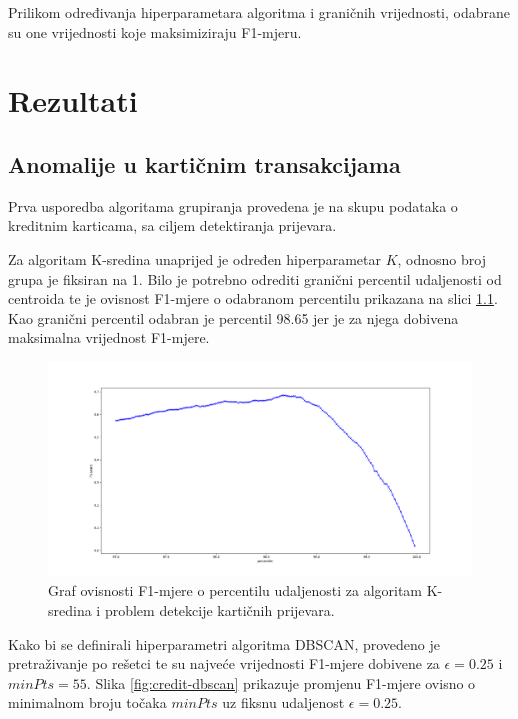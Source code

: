 \documentclass[utf8, diplomski, numeric]{fer}
\begin{document}
Prilikom određivanja hiperparametara algoritma i graničnih vrijednosti, odabrane su one vrijednosti koje maksimiziraju F1-mjeru.


\chapter{Rezultati}

\section{Anomalije u kartičnim transakcijama}
Prva usporedba algoritama grupiranja provedena je na skupu podataka o kreditnim karticama, sa ciljem detektiranja prijevara.

Za algoritam K-sredina unaprijed je određen hiperparametar $K$, odnosno broj grupa je fiksiran na 1. Bilo je potrebno odrediti granični percentil udaljenosti od centroida te je ovisnost F1-mjere o odabranom percentilu prikazana na slici \ref{fig:credit-kmeans}. Kao granični percentil odabran je percentil 98.65 jer je za njega dobivena maksimalna vrijednost F1-mjere.

\begin{figure}[h!]
\includegraphics[width=1\textwidth]{images/credit-kmeans-f1.png}
\centering
\caption{Graf ovisnosti F1-mjere o percentilu udaljenosti za algoritam K-sredina i problem detekcije kartičnih prijevara.}
\label{fig:credit-kmeans}
\end{figure}

Kako bi se definirali hiperparametri algoritma DBSCAN, provedeno je pretraživanje po rešetci te su najveće vrijednosti F1-mjere dobivene za $\epsilon = 0.25$ i $minPts = 55$. Slika \ref{fig:credit-dbscan} prikazuje promjenu F1-mjere ovisno o minimalnom broju točaka $minPts$ uz fiksnu udaljenost $\epsilon = 0.25$.
\end{document}
